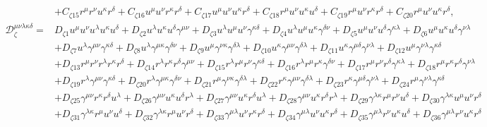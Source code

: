 \documentclass[10pt,twocolumn,preprintnumbers,amsmath,amssymb,nofootinbib
,superscriptaddress]{revtex4-1}
\begin{document}
{\begin{widetext}
\begin{align}
 &+C_{\zeta15}r^\mu r^\nu u^\kappa r^\delta +C_{\zeta16} u^\mu u^\nu r^\kappa r^\delta +C_{\zeta17}u^\mu u^\nu u^\kappa r^\delta +C_{\zeta18} r^\mu u^\nu u^\kappa u^\delta +C_{\zeta19} r^\mu u^\nu r^\kappa r^\delta +C_{\zeta20} r^\mu u^\nu u^\kappa r^\delta,\\
 \mathcal{D}_{\zeta}^{\mu\nu\lambda\kappa\delta}=&D_{\zeta1}u^\mu u^\nu u^\lambda u^\kappa u^\delta+D_{\zeta2}u^\lambda u^\kappa u^\delta \gamma^{\mu\nu} + D_{\zeta3}u^\lambda u^\mu u^\nu \gamma^{\kappa\delta} +D_{\zeta4}u^\lambda u^\mu u^\kappa \gamma^{\delta\nu} +D_{\zeta5}u^\mu u^\nu u^\delta \gamma^{\kappa\lambda} +D_{\zeta6}u^\mu u^\kappa u^\delta \gamma^{\nu\lambda} \nonumber\\
 & + D_{\zeta7}u^\lambda\gamma^{\mu\nu}\gamma^{\kappa\delta} + D_{\zeta8}u^\lambda\gamma^{\mu\kappa}\gamma^{\delta\nu} +D_{\zeta9}u^\mu\gamma^{\nu\kappa}\gamma^{\delta\lambda}+D_{\zeta10}u^\kappa\gamma^{\mu\nu}\gamma^{\delta\lambda} +D_{\zeta11}u^\kappa\gamma^{\mu\delta}\gamma^{\nu\lambda}+D_{\zeta12}u^\mu\gamma^{\nu\lambda}\gamma^{\kappa\delta}\nonumber\\
 &+D_{\zeta13}r^\mu r^\nu r^\lambda r^\kappa r^\delta+D_{\zeta14}r^\lambda r^\kappa r^\delta \gamma^{\mu\nu} + D_{\zeta15}r^\lambda r^\mu r^\nu \gamma^{\kappa\delta} +D_{\zeta16}r^\lambda r^\mu r^\kappa \gamma^{\delta\nu} +D_{\zeta17}r^\mu r^\nu r^\delta \gamma^{\kappa\lambda} +D_{\zeta18}r^\mu r^\kappa r^\delta \gamma^{\nu\lambda} \nonumber\\
 & + D_{\zeta19}r^\lambda\gamma^{\mu\nu}\gamma^{\kappa\delta} + D_{\zeta20}r^\lambda\gamma^{\mu\kappa}\gamma^{\delta\nu} +D_{\zeta21}r^\mu\gamma^{\nu\kappa}\gamma^{\delta\lambda}+D_{\zeta22}r^\kappa\gamma^{\mu\nu}\gamma^{\delta\lambda} +D_{\zeta23}r^\kappa\gamma^{\mu\delta}\gamma^{\nu\lambda}+D_{\zeta24}r^\mu\gamma^{\nu\lambda}\gamma^{\kappa\delta}\nonumber\\
 &+D_{\zeta25}\gamma^{\mu\nu}r^\kappa r^\delta u^\lambda+D_{\zeta26}\gamma^{\mu\nu}u^\kappa u^\delta r^\lambda +D_{\zeta27}\gamma^{\mu\nu} u^\kappa r^\delta u^\lambda +D_{\zeta28}\gamma^{\mu\nu} u^\kappa r^\delta r^\lambda +D_{\zeta29}\gamma^{\lambda\kappa}r^\mu r^\nu u^\delta +D_{\zeta30}\gamma^{\lambda\kappa}u^\mu u^\nu r^\delta \nonumber\\
 &+D_{\zeta31}\gamma^{\lambda\kappa}r^\mu u^\nu u^\delta+D_{\zeta32}\gamma^{\lambda\kappa}r^\mu u^\nu r^\delta +D_{\zeta33}\gamma^{\mu\lambda}u^\nu r^\kappa r^\delta +D_{\zeta34}\gamma^{\mu\lambda}u^\nu u^\kappa r^\delta +D_{\zeta35}\gamma^{\mu\lambda}r^\nu u^\kappa u^\delta +D_{\zeta36}\gamma^{\mu\lambda}r^\nu u^\kappa r^\delta\nonumber\\

\end{align}
\end{widetext}}
\end{document}
